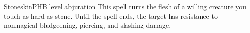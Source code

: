 \begin{spell}{Stoneskin}{PHB}{ level abjuration}
{
}
This spell turns the flesh of a willing creature you touch
as hard as stone. Until the spell ends, the target has
resistance to nonmagical bludgeoning, piercing, and
slashing damage.
\end{spell}